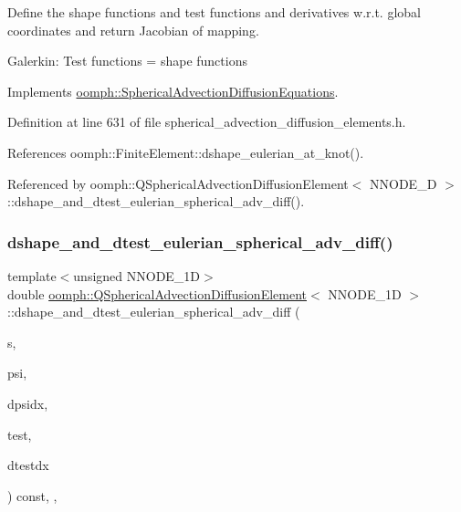 Define the shape functions and test functions and derivatives w.\+r.\+t. global coordinates and return Jacobian of mapping.

Galerkin\+: Test functions = shape functions 

Implements \hyperlink{classoomph_1_1SphericalAdvectionDiffusionEquations_a2b61d50b166871a64507ee13b8e94f54}{oomph\+::\+Spherical\+Advection\+Diffusion\+Equations}.



Definition at line 631 of file spherical\+\_\+advection\+\_\+diffusion\+\_\+elements.\+h.



References oomph\+::\+Finite\+Element\+::dshape\+\_\+eulerian\+\_\+at\+\_\+knot().



Referenced by oomph\+::\+Q\+Spherical\+Advection\+Diffusion\+Element$<$ N\+N\+O\+D\+E\+\_\+D $>$\+::dshape\+\_\+and\+\_\+dtest\+\_\+eulerian\+\_\+spherical\+\_\+adv\+\_\+diff().

\mbox{\label{classoomph_1_1QSphericalAdvectionDiffusionElement_a75d5e8f33411030e31e82da809d946d2}} 
\subsubsection{\texorpdfstring{dshape\+\_\+and\+\_\+dtest\+\_\+eulerian\+\_\+spherical\+\_\+adv\+\_\+diff()}{dshape\_and\_dtest\_eulerian\_spherical\_adv\_diff()}}
{\footnotesize\ttfamily template$<$unsigned N\+N\+O\+D\+E\+\_\+1D$>$ \\
double \hyperlink{classoomph_1_1QSphericalAdvectionDiffusionElement}{oomph\+::\+Q\+Spherical\+Advection\+Diffusion\+Element}$<$ N\+N\+O\+D\+E\+\_\+1D $>$\+::dshape\+\_\+and\+\_\+dtest\+\_\+eulerian\+\_\+spherical\+\_\+adv\+\_\+diff (\begin{DoxyParamCaption}\item[{const \hyperlink{classoomph_1_1Vector}{Vector}$<$ double $>$ \&}]{s,  }\item[{\hyperlink{classoomph_1_1Shape}{Shape} \&}]{psi,  }\item[{\hyperlink{classoomph_1_1DShape}{D\+Shape} \&}]{dpsidx,  }\item[{\hyperlink{classoomph_1_1Shape}{Shape} \&}]{test,  }\item[{\hyperlink{classoomph_1_1DShape}{D\+Shape} \&}]{dtestdx }\end{DoxyParamCaption}) const\hspace{0.3cm}{\ttfamily [inline]}, {\ttfamily [protected]}, {\ttfamily [virtual]}}



